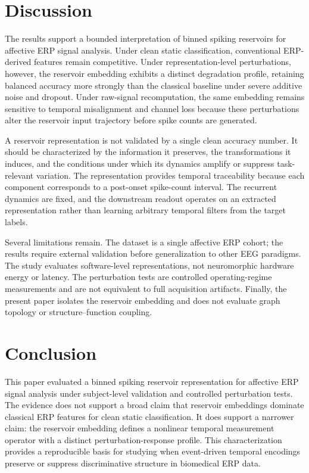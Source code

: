 \section{Discussion}
The results support a bounded interpretation of binned spiking reservoirs for affective ERP signal analysis. Under clean static classification, conventional ERP-derived features remain competitive. Under representation-level perturbations, however, the reservoir embedding exhibits a distinct degradation profile, retaining balanced accuracy more strongly than the classical baseline under severe additive noise and dropout. Under raw-signal recomputation, the same embedding remains sensitive to temporal misalignment and channel loss because these perturbations alter the reservoir input trajectory before spike counts are generated.

A reservoir representation is not validated by a single clean accuracy number. It should be characterized by the information it preserves, the transformations it induces, and the conditions under which its dynamics amplify or suppress task-relevant variation. The \BSC{} representation provides temporal traceability because each component corresponds to a post-onset spike-count interval. The recurrent dynamics are fixed, and the downstream readout operates on an extracted representation rather than learning arbitrary temporal filters from the target labels.

Several limitations remain. The dataset is a single affective ERP cohort; the results require external validation before generalization to other EEG paradigms. The study evaluates software-level representations, not neuromorphic hardware energy or latency. The perturbation tests are controlled operating-regime measurements and are not equivalent to full acquisition artifacts. Finally, the present paper isolates the reservoir embedding and does not evaluate graph topology or structure--function coupling.

\section{Conclusion}
This paper evaluated a binned spiking reservoir representation for affective ERP signal analysis under subject-level validation and controlled perturbation tests. The evidence does not support a broad claim that reservoir embeddings dominate classical ERP features for clean static classification. It does support a narrower claim: the reservoir embedding defines a nonlinear temporal measurement operator with a distinct perturbation-response profile. This characterization provides a reproducible basis for studying when event-driven temporal encodings preserve or suppress discriminative structure in biomedical ERP data.
